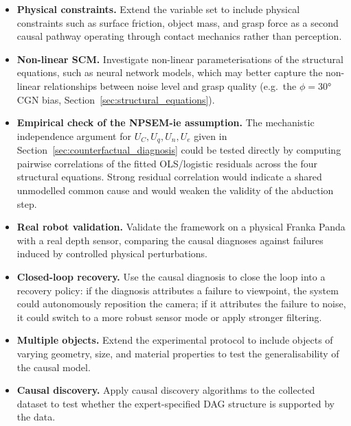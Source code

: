 \documentclass[11pt,a4paper]{report}
\begin{document}
\begin{itemize}
  \item \textbf{Physical constraints.} Extend the variable set to include physical constraints such as surface friction, object mass, and grasp force as a second causal pathway operating through contact mechanics rather than perception.

  \item \textbf{Non-linear SCM.} Investigate non-linear parameterisations of the structural equations, such as neural network models, which may better capture the non-linear relationships between noise level and grasp quality (e.g.\ the $\phi = 30°$ CGN bias, Section~\ref{sec:structural_equations}).

  \item \textbf{Empirical check of the NPSEM-ie assumption.} The mechanistic independence argument for $U_C, U_q, U_n, U_e$ given in Section~\ref{sec:counterfactual_diagnosis} could be tested directly by computing pairwise correlations of the fitted OLS/logistic residuals across the four structural equations. Strong residual correlation would indicate a shared unmodelled common cause and would weaken the validity of the abduction step.

  \item \textbf{Real robot validation.} Validate the framework on a physical Franka Panda with a real depth sensor, comparing the causal diagnoses against failures induced by controlled physical perturbations.

  \item \textbf{Closed-loop recovery.} Use the causal diagnosis to close the loop into a recovery policy: if the diagnosis attributes a failure to viewpoint, the system could autonomously reposition the camera; if it attributes the failure to noise, it could switch to a more robust sensor mode or apply stronger filtering.

  \item \textbf{Multiple objects.} Extend the experimental protocol to include objects of varying geometry, size, and material properties to test the generalisability of the causal model.

  \item \textbf{Causal discovery.} Apply causal discovery algorithms to the collected dataset to test whether the expert-specified DAG structure is supported by the data.
\end{itemize}


\end{document}

